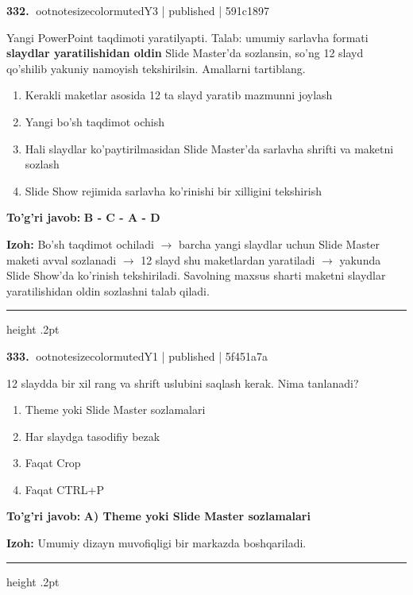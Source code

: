 \documentclass[10pt,a4paper]{article}
\begin{document}
\textbf{\color{ink}332.} {ootnotesizecolor{muted}Y3 | published | 591c1897}
\par
Yangi PowerPoint taqdimoti yaratilyapti. Talab: umumiy sarlavha formati \textbf{slaydlar yaratilishidan oldin} Slide Master'da sozlansin, so'ng 12 slayd qo'shilib yakuniy namoyish tekshirilsin. Amallarni tartiblang.
\begin{enumerate}[label=\Alph*),leftmargin=9mm]
\item Kerakli maketlar asosida 12 ta slayd yaratib mazmunni joylash
\item Yangi bo'sh taqdimot ochish
\item Hali slaydlar ko'paytirilmasidan Slide Master'da sarlavha shrifti va maketni sozlash
\item Slide Show rejimida sarlavha ko'rinishi bir xilligini tekshirish
\end{enumerate}
\begin{tcolorbox}[enhanced,breakable,colback=teal!4,colframe=teal!55!black,boxrule=0.45pt,arc=1.2mm,left=2.8mm,right=2.8mm,top=2mm,bottom=2mm]
\textbf{\color{teal}To'g'ri javob:} \textbf{B - C - A - D}
\par\smallskip
\textbf{Izoh:} Bo'sh taqdimot ochiladi \ensuremath{\rightarrow} barcha yangi slaydlar uchun Slide Master maketi avval sozlanadi \ensuremath{\rightarrow} 12 slayd shu maketlardan yaratiladi \ensuremath{\rightarrow} yakunda Slide Show'da ko'rinish tekshiriladi. Savolning maxsus sharti maketni slaydlar yaratilishidan oldin sozlashni talab qiladi.
\end{tcolorbox}
\vspace{2mm}\hrule height .2pt\vspace{2mm}

\textbf{\color{ink}333.} {ootnotesizecolor{muted}Y1 | published | 5f451a7a}
\par
12 slaydda bir xil rang va shrift uslubini saqlash kerak. Nima tanlanadi?
\begin{enumerate}[label=\Alph*),leftmargin=9mm]
\item Theme yoki Slide Master sozlamalari
\item Har slaydga tasodifiy bezak
\item Faqat Crop
\item Faqat CTRL+P
\end{enumerate}
\begin{tcolorbox}[enhanced,breakable,colback=teal!4,colframe=teal!55!black,boxrule=0.45pt,arc=1.2mm,left=2.8mm,right=2.8mm,top=2mm,bottom=2mm]
\textbf{\color{teal}To'g'ri javob:} \textbf{A) Theme yoki Slide Master sozlamalari}
\par\smallskip
\textbf{Izoh:} Umumiy dizayn muvofiqligi bir markazda boshqariladi.
\end{tcolorbox}
\vspace{2mm}\hrule height .2pt\vspace{2mm}
\end{document}
